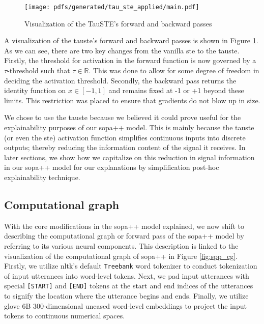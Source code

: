 \begin{figure}[t!]
  \centering
  \texttt{[image: pdfs/generated/tau\_ste\_applied/main.pdf]}
  \caption{Visualization of the TauSTE's forward and backward passes}
  \label{fig:tau_ste}
\end{figure}

A visualization of the \ac{tauste}'s forward and backward passes is shown in Figure
\ref{fig:tau_ste}. As we can see, there are two key changes from the vanilla \ac{ste}
to the \ac{tauste}. Firstly, the threshold for activation in the forward function is
now governed by a $\tau$-threshold such that $\tau \in \mathbb{R}$. This was
done to allow for some degree of freedom in deciding the activation threshold.
Secondly, the backward pass returns the identity function on $x \in [-1,1]$ and
remains fixed at -1 or +1 beyond these limits. This restriction was placed to
ensure that gradients do not blow up in size.

We chose to use the \ac{tauste} because we believed it could prove useful for the
explainability purposes of our \ac{sopa}++ model. This is mainly because the \ac{tauste}
(or even the \ac{ste}) activation function simplifies continuous inputs into discrete
outputs; thereby reducing the information content of the signal it receives. In
later sections, we show how we capitalize on this reduction in signal
information in our \ac{sopa}++ model for our explanations by simplification post-hoc
explainability technique.

\subsection{Computational graph}

With the core modifications in the \ac{sopa}++ model explained, we now shift to
describing the computational graph or forward pass of the \ac{sopa}++ model by
referring to its various neural components. This description is linked to the
visualization of the computational graph of \ac{sopa}++ in Figure \ref{fig:spp_cg}.
Firstly, we utilize \ac{nltk}'s default \texttt{Treebank} word tokenizer
\citep{bird-loper-2004-nltk} to conduct tokenization of input utterances into
word-level tokens. Next, we pad input utterances with special \texttt{[START]}
and \texttt{[END]} tokens at the start and end indices of the utterances to
signify the location where the utterance begins and ends. Finally, we utilize
\ac{glove} 6B 300-dimensional uncased word-level embeddings
\citep{pennington2014glove} to project the input tokens to continuous numerical
spaces. 

